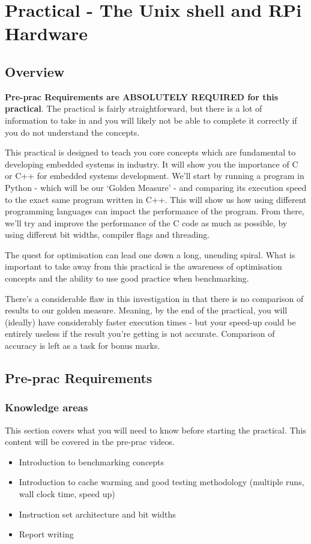 \section{Practical - The Unix shell and RPi Hardware}
\label{sec:Prac2}
\subsection{Overview}
\textbf{Pre-prac Requirements are ABSOLUTELY REQUIRED for this practical}. The practical is fairly straightforward, but there is a lot of information to take in and you will likely not be able to complete it correctly if you do not understand the concepts.

This practical is designed to teach you core concepts which are fundamental to developing embedded systems in industry. It will show you the importance of C or C++ for embedded systems development. We'll start by running a program in Python - which will be our `Golden Measure' - and comparing its execution speed to the exact same program written in C++. This will show us how using different programming languages can impact the performance of the program. From there, we'll try and improve the performance of the C code as much as possible, by using different bit widths, compiler flags and threading. 

The quest for optimisation can lead one down a long, unending spiral. What is important to take away from this practical is the awareness of optimisation concepts and the ability to use good practice when benchmarking.

There's a considerable flaw in this investigation in that there is no comparison of results to our golden measure. Meaning, by the end of the practical, you will (ideally) have considerably faster execution times - but your speed-up could be entirely useless if the result you're getting is not accurate. Comparison of accuracy is left as a task for bonus marks. 

\subsection{Pre-prac Requirements}
\subsubsection{Knowledge areas}
This section covers what you will need to know before starting the practical. This content will be covered in the pre-prac videos.
\begin{itemize}
    \item Introduction to benchmarking concepts
    \item Introduction to cache warming and good testing methodology (multiple runs, wall clock time, speed up)
    \item Instruction set architecture and bit widths
    \item Report writing
\end{itemize} 
